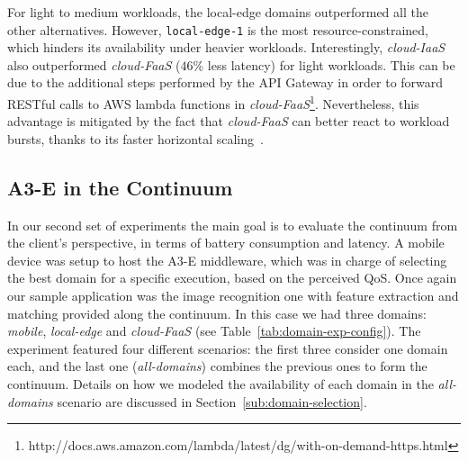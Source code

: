  For light to medium workloads, the local-edge domains outperformed all the other alternatives. However, \texttt{local-edge-1} is the most resource-constrained, which hinders its availability under heavier workloads. Interestingly, \textit{cloud-IaaS} also outperformed  \textit{cloud-FaaS} ($46$\% less latency) for light workloads. This can be due to the additional steps performed by the API Gateway in order to forward RESTful calls to AWS lambda functions in  \textit{cloud-FaaS}\footnote{http://docs.aws.amazon.com/lambda/latest/dg/with-on-demand-https.html}. Nevertheless, this advantage is mitigated by the fact that \textit{cloud-FaaS} can better react to workload bursts, thanks to its faster horizontal scaling~\cite{Villamizar2017lambda,Hendrickson:2016}.



\subsection{A3-E in the Continuum} 

In our second set of experiments the main goal is to evaluate the continuum from the client's perspective, in terms of battery consumption and latency. A mobile device was setup to host the A3-E middleware, which was in charge of  selecting the best domain for a specific execution, based on the perceived QoS. 
Once again our sample application was the image recognition one with feature extraction and matching provided along the continuum. In this case we had three domains: \textit{mobile}, \textit{local-edge} and \textit{cloud-FaaS} (see Table~\ref{tab:domain-exp-config}). The experiment featured four different scenarios: the first three consider one domain each, and the last one (\textit{all-domains}) combines the previous ones to form the continuum. Details on how we modeled the availability of each domain in the \textit{all-domains} scenario are discussed in Section~\ref{sub:domain-selection}.

